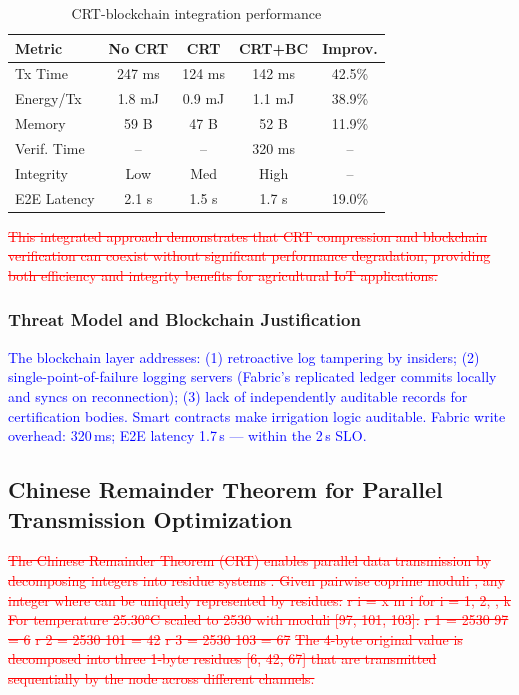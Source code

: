 \documentclass[pdflatex,sn-mathphys-num]{sn-jnl}
\theoremstyle{thmstyleone}
\theoremstyle{thmstyletwo}
\theoremstyle{thmstylethree}
\begin{document}
{\begin{table}[htbp]
\centering
\scriptsize
\caption{CRT-blockchain integration performance}
\label{tab:integration_performance}
\begin{tabular}{@{}lcccc@{}}
\toprule
\textbf{Metric} & \textbf{No CRT} & \textbf{CRT} & \textbf{CRT+BC} & \textbf{Improv.} \\
\midrule
Tx Time         & 247 ms & 124 ms & 142 ms & 42.5\% \\
Energy/Tx       & 1.8 mJ & 0.9 mJ & 1.1 mJ & 38.9\% \\
Memory          & 59 B   & 47 B   & 52 B   & 11.9\% \\
Verif. Time     & --     & --     & 320 ms & -- \\
Integrity       & Low    & Med    & High   & -- \\
E2E Latency     & 2.1 s  & 1.5 s  & 1.7 s  & 19.0\% \\
\bottomrule
\end{tabular}
\end{table}

\textcolor{red}{\sout{This integrated approach demonstrates that CRT compression and blockchain verification can coexist without significant performance degradation, providing both efficiency and integrity benefits for agricultural IoT applications.}}
\subsubsection{Threat Model and Blockchain Justification}
\label{subsubsec:threat_model}

\textcolor{blue}{The blockchain layer addresses: (1) retroactive log tampering by insiders; (2) single-point-of-failure logging servers (Fabric's replicated ledger commits locally and syncs on reconnection); (3) lack of independently auditable records for certification bodies. Smart contracts make irrigation logic auditable. Fabric write overhead: 320\,ms; E2E latency 1.7\,s — within the 2\,s SLO.}

\subsection{Chinese Remainder Theorem for Parallel Transmission Optimization}
\label{subsec:crt_transmission}

\textcolor{red}{\sout{The Chinese Remainder Theorem (CRT) enables parallel data transmission by decomposing integers into residue systems . Given pairwise coprime moduli , any integer where can be uniquely represented by residues:}}
\textcolor{red}{\sout{r i = x m i for i = 1, 2, , k}}
\textcolor{red}{\sout{For temperature 25.30°C scaled to 2530 with moduli [97, 101, 103]:}}
\textcolor{red}{\sout{r 1 = 2530 97 = 6}}
\textcolor{red}{\sout{r 2 = 2530 101 = 42}}
\textcolor{red}{\sout{r 3 = 2530 103 = 67}}
\textcolor{red}{\sout{The 4-byte original value is decomposed into three 1-byte residues [6, 42, 67] that are transmitted sequentially by the node across different channels.}}
}
\end{document}

